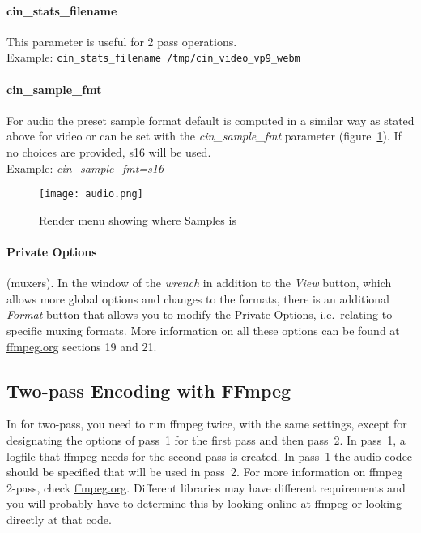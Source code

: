 \paragraph{cin\_stats\_filename} This parameter is useful for 2 pass
operations.\\ Example: \texttt{cin\_stats\_filename
  /tmp/cin\_video\_vp9\_webm}

\paragraph{cin\_sample\_fmt} For audio the preset sample format
default is computed in a similar way as stated above for video or
can be set with the \textit{cin\_sample\_fmt} parameter
(figure~\ref{fig:audio}).  If no choices are provided, s16 will be
used.\\ Example: \textit{cin\_sample\_fmt=s16}

\begin{figure}[htpb] \centering
  \texttt{[image: audio.png]}
  \caption{Render menu showing where Samples is}
  \label{fig:audio}
\end{figure}

\paragraph{Private Options} (muxers). In the window of the
\textit{wrench} in addition to the \textit{View} button, which
allows more global options and changes to the formats, there is an
additional \textit{Format} button that allows you to modify the
Private Options, i.e.\ relating to specific muxing formats. More
information on all these options can be found at
\href{https://ffmpeg.org/ffmpeg-all.html#Format-Options}{ffmpeg.org}
sections 19 and 21.

\subsection{Two-pass Encoding with FFmpeg}%
\label{sub:two_pass_encoding_ffmpeg}

In \CGG{} for two-pass, you need to run ffmpeg twice, with the same
settings, except for designating the options of pass~1 for the first
pass and then pass~2.  In pass~1, a logfile that ffmpeg needs for
the second pass is created.  In pass~1 the audio codec should be
specified that will be used in pass~2.  For more information on
ffmpeg 2-pass, check
\href{https://trac.ffmpeg.org/wiki/Encode/H.264}{ffmpeg.org}.
Different libraries may have different requirements and you will
probably have to determine this by looking online at ffmpeg or
looking directly at that code.

